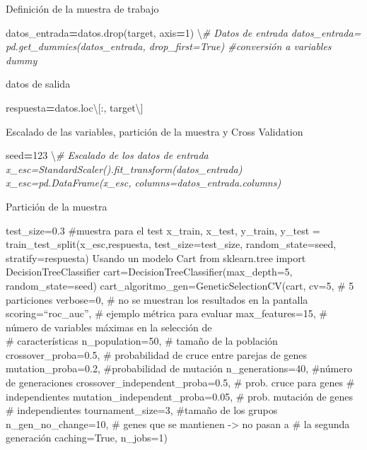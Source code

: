 \documentclass[
  a4paper,
  DIV=11,
  numbers=noendperiod]{scrreprt}
\newenvironment{Shaded}{\begin{snugshade}}{\end{snugshade}}
\newcommand{\CommentTok}[1]{\textcolor[rgb]{0.56,0.35,0.01}{\textit{#1}}}
\newcommand{\DecValTok}[1]{\textcolor[rgb]{0.00,0.00,0.81}{#1}}
\newcommand{\NormalTok}[1]{#1}
\newcommand{\OperatorTok}[1]{\textcolor[rgb]{0.81,0.36,0.00}{\textbf{#1}}}
\newcommand{\StringTok}[1]{\textcolor[rgb]{0.31,0.60,0.02}{#1}}
\begin{document}
Definición de la muestra de trabajo

\begin{Shaded}
\begin{Highlighting}[numbers=left,,]
\NormalTok{datos\_entrada}\OperatorTok{=}\NormalTok{datos.drop(}\StringTok{\textquotesingle{}target\textquotesingle{}}\NormalTok{, axis}\OperatorTok{=}\DecValTok{1}\NormalTok{) \textbackslash{}}\CommentTok{\# Datos de entrada datos\_entrada= pd.get\_dummies(datos\_entrada, drop\_first=True) \#conversión a variables dummy}
\end{Highlighting}
\end{Shaded}

datos de salida

\begin{Shaded}
\begin{Highlighting}[numbers=left,,]
\NormalTok{respuesta}\OperatorTok{=}\NormalTok{datos.loc\textbackslash{}[:, }\StringTok{\textquotesingle{}target\textquotesingle{}}\NormalTok{\textbackslash{}]}
\end{Highlighting}
\end{Shaded}

Escalado de las variables, partición de la muestra y Cross Validation

\begin{Shaded}
\begin{Highlighting}[numbers=left,,]
\NormalTok{seed}\OperatorTok{=}\DecValTok{123}\NormalTok{ \textbackslash{}}\CommentTok{\# Escalado de los datos de entrada x\_esc=StandardScaler().fit\_transform(datos\_entrada) x\_esc=pd.DataFrame(x\_esc, columns=datos\_entrada.columns)}
\end{Highlighting}
\end{Shaded}

Partición de la muestra

test\_size=0.3 \#muestra para el test x\_train, x\_test, y\_train,
y\_test = train\_test\_split(x\_esc,respuesta, test\_size=test\_size,
random\_state=seed, stratify=respuesta) Usando un modelo Cart from
sklearn.tree import DecisionTreeClassifier
cart=DecisionTreeClassifier(max\_depth=5, random\_state=seed)
cart\_algoritmo\_gen=GeneticSelectionCV(cart, cv=5, \# 5 particiones
verbose=0, \# no se muestran los resultados en la pantalla
scoring=``roc\_auc'', \# ejemplo métrica para evaluar max\_features=15,
\# número de variables máximas en la selección de\\
\# características n\_population=50, \# tamaño de la población
crossover\_proba=0.5, \# probabilidad de cruce entre parejas de genes
mutation\_proba=0.2, \#probabilidad de mutación n\_generations=40,
\#número de generaciones crossover\_independent\_proba=0.5, \# prob.
cruce para genes \# independientes mutation\_independent\_proba=0.05, \#
prob. mutación de genes \# independientes tournament\_size=3, \#tamaño
de los grupos n\_gen\_no\_change=10, \# genes que se mantienen
-\textgreater{} no pasan a \# la segunda generación caching=True,
n\_jobs=1)
\end{document}
